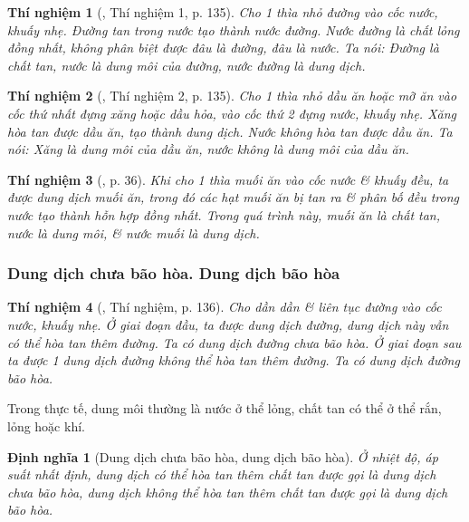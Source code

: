 \documentclass{article}
\newtheorem{dinhnghia}{Định nghĩa}
\newtheorem{thinghiem}{Thí nghiệm}
\begin{document}
\begin{thinghiem}[\cite{SGK_Hoa_Hoc_8}, Thí nghiệm 1, p. 135]
	Cho 1 thìa nhỏ đường vào cốc nước, khuấy nhẹ. Đường tan trong nước tạo thành nước đường. Nước đường là chất lỏng đồng nhất, không phân biệt được đâu là đường, đâu là nước. Ta nói: Đường là \emph{chất tan}, nước là \emph{dung môi} của đường, nước đường là \emph{dung dịch}.
\end{thinghiem}

\begin{thinghiem}[\cite{SGK_Hoa_Hoc_8}, Thí nghiệm 2, p. 135]
	Cho 1 thìa nhỏ dầu ăn hoặc mỡ ăn vào cốc thứ nhất đựng xăng hoặc dầu hỏa, vào cốc thứ 2 đựng nước, khuấy nhẹ. Xăng hòa tan được dầu ăn, tạo thành dung dịch. Nước không hòa tan được dầu ăn. Ta nói: Xăng là \emph{dung môi} của dầu ăn, nước không là dung môi của dầu ăn.
\end{thinghiem}

\begin{thinghiem}[\cite{SGK_KHTN_8_Canh_Dieu}, p. 36]
	Khi cho 1 thìa muối ăn vào cốc nước \& khuấy đều, ta được dung dịch muối ăn, trong đó các hạt muối ăn bị tan ra \& phân bố đều trong nước tạo thành hỗn hợp đồng nhất. Trong quá trình này, muối ăn là \emph{chất tan}, nước là \emph{dung môi}, \& nước muối là \emph{dung dịch}.
\end{thinghiem}

\subsubsection{Dung dịch chưa bão hòa. Dung dịch bão hòa}

\begin{thinghiem}[\cite{SGK_Hoa_Hoc_8}, Thí nghiệm, p. 136]
	Cho dần dần \& liên tục đường vào cốc nước, khuấy nhẹ. Ở giai đoạn đầu, ta được dung dịch đường, dung dịch này vẫn có thể hòa tan thêm đường. Ta có \emph{dung dịch đường chưa bão hòa}. Ở giai đoạn sau ta được 1 dung dịch đường không thể hòa tan thêm đường. Ta có \emph{dung dịch đường bão hòa}.
\end{thinghiem}
Trong thực tế, dung môi thường là nước ở thể lỏng, chất tan có thể ở thể rắn, lỏng hoặc khí.

\begin{dinhnghia}[Dung dịch chưa bão hòa, dung dịch bão hòa]
	Ở nhiệt độ, áp suất nhất định, dung dịch có thể hòa tan thêm chất tan được gọi là \emph{dung dịch chưa bão hòa}, dung dịch không thể hòa tan thêm chất tan được gọi là \emph{dung dịch bão hòa}.
\end{dinhnghia}
\end{document}
